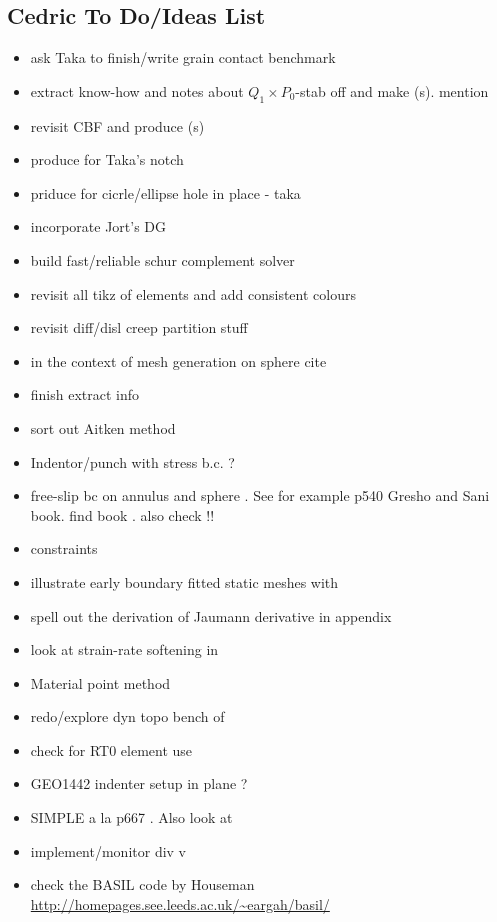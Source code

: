 \subsection{Cedric To Do/Ideas List}

\begin{itemize}
\item ask Taka to finish/write grain contact benchmark
\item extract know-how and notes about $Q_1 \times P_0$-stab off \elefant and 
make \stone(s). mention \cite{lisi12}
\item revisit CBF and produce \stone(s)
\item produce \stone for Taka's notch
\item priduce \stone for cicrle/ellipse hole in place - taka
\item incorporate Jort's DG 
\item build fast/reliable schur complement solver
\item revisit all tikz of elements and add consistent colours
\item revisit diff/disl creep partition stuff
\item in the context of mesh generation on sphere cite \cite{moma19}
\item finish extract info 
\item sort out Aitken method
\item Indentor/punch with stress b.c. ?
\item free-slip bc on annulus and sphere . See for example p540 Gresho and Sani book. find book \cite{deab72}.
also check \cite{ensg82} !!
\item constraints \cite{absh79}
\item illustrate early boundary fitted static meshes with \cite{thar85}
\item \cite{bepo10} spell out the derivation of Jaumann derivative in appendix
\item look at strain-rate softening in \cite{belz02}
\item Material point method \cite{sucs94,susc96,susp07}
\item redo/explore dyn topo bench of \cite{bore19}
\item check \cite{bufm19} for RT0 element use
\item GEO1442 indenter setup in plane ?
\item SIMPLE a la p667 \cite{john16}. Also look at \cite{vusb00} 
\item implement/monitor div v
\item check the BASIL code by Houseman \etal \url{http://homepages.see.leeds.ac.uk/~eargah/basil/}

\end{itemize}

